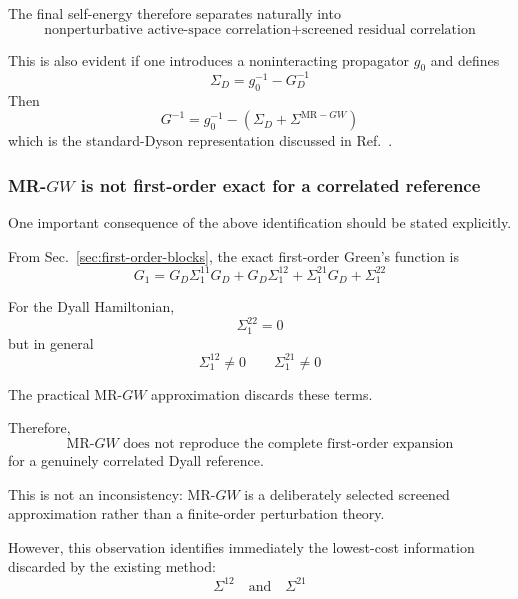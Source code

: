 \documentclass[aip,jcp,reprint,noshowkeys,superscriptaddress]{revtex4-1}
\begin{document}
The final self-energy therefore separates naturally into
\begin{equation}
  \text{nonperturbative active-space correlation}
  +
  \text{screened residual correlation}
\end{equation}

This is also evident if one introduces a noninteracting propagator
$g_0$ and defines
\begin{equation}
  \Sigma_D
  =
  g_0^{-1}
  -
  G_D^{-1}
\end{equation}
Then
\begin{equation}
  G^{-1}
  =
  g_0^{-1}
  -
  \left(
    \Sigma_D
    +
    \Sigma^{\mathrm{MR-}GW}
  \right)
\end{equation}
which is the standard-Dyson representation discussed in
Ref.~\cite{WangFangLi2026}.


\subsubsection{MR-\texorpdfstring{$GW$}{GW} is not first-order exact for a
correlated reference}

One important consequence of the above identification should be stated
explicitly.

From Sec.~\ref{sec:first-order-blocks}, the exact first-order Green's function is
\begin{equation}
  G_1
  =
  G_D\Sigma_1^{11}G_D
  +
  G_D\Sigma_1^{12}
  +
  \Sigma_1^{21}G_D
  +
  \Sigma_1^{22}
\end{equation}

For the Dyall Hamiltonian,
\begin{equation}
  \Sigma_1^{22}=0
\end{equation}
but in general
\begin{equation}
  \Sigma_1^{12}\neq0
  \qquad
  \Sigma_1^{21}\neq0
\end{equation}

The practical MR-$GW$ approximation discards these terms.

Therefore,
\begin{equation}
  \text{MR-}GW
  \text{ does not reproduce the complete first-order expansion}
\end{equation}
for a genuinely correlated Dyall reference.

This is not an inconsistency: MR-$GW$ is a deliberately selected
screened approximation rather than a finite-order perturbation theory.

However, this observation identifies immediately the lowest-cost
information discarded by the existing method:
\begin{equation}
  \Sigma^{12}
  \quad\text{and}\quad
  \Sigma^{21}
\end{equation}
\end{document}
